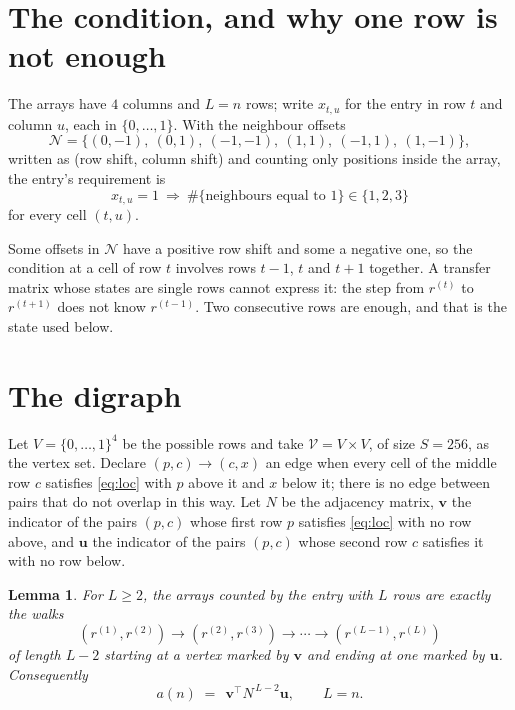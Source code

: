 \documentclass[11pt,a4paper]{article}
\theoremstyle{plain}
\newtheorem{lemma}[theorem]{Lemma}
\theoremstyle{definition}
\begin{document}
\section{The condition, and why one row is not enough}

The arrays have $4$ columns and $L=n$ rows; write $x_{t,u}$ for the entry in
row $t$ and column $u$, each in $\{0,\dots,1\}$. With the neighbour offsets
\[
\mathcal N=\{(0,-1),\ (0,1),\ (-1,-1),\ (1,1),\ (-1,1),\ (1,-1)\},
\]
written as (row shift, column shift) and counting only positions inside the array, the
entry's requirement is
\begin{equation}\label{eq:loc}
x_{t,u}=1\ \Rightarrow\ \#\{\text{neighbours equal to }1\}\in\{1,2,3\}
\end{equation}
for every cell $(t,u)$.

Some offsets in $\mathcal N$ have a positive row shift and some a negative one, so the
condition at a cell of row $t$ involves rows $t-1$, $t$ and $t+1$ together. A transfer
matrix whose states are single rows cannot express it: the step from $r^{(t)}$ to
$r^{(t+1)}$ does not know $r^{(t-1)}$. Two consecutive rows are enough, and that is
the state used below.

\section{The digraph}

Let $V=\{0,\dots,1\}^{4}$ be the possible rows and take
$\mathcal V=V\times V$, of size $S=256$, as the vertex set. Declare $(p,c)\to(c,x)$ an edge
when every cell of the middle row $c$ satisfies \eqref{eq:loc} with $p$ above it and $x$
below it; there is no edge between pairs that do not overlap in this way. Let $N$ be the
adjacency matrix, $\mathbf{v}$ the indicator of the pairs $(p,c)$ whose first row $p$
satisfies \eqref{eq:loc} with no row above, and $\mathbf{u}$ the indicator of
the pairs $(p,c)$ whose second row $c$ satisfies it with no row below.

\begin{lemma}\label{lem:walk}
For $L\ge2$, the arrays counted by the entry with $L$ rows are exactly the walks
\[
(r^{(1)},r^{(2)})\to(r^{(2)},r^{(3)})\to\cdots\to(r^{(L-1)},r^{(L)})
\]
of length $L-2$ starting at a vertex marked by $\mathbf{v}$ and ending at one marked by
$\mathbf{u}$. Consequently
\[
a(n)\;=\;\,\mathbf{v}^{\!\top}N^{\,L-2}\mathbf{u},\qquad L=n .
\]
\end{lemma}
\end{document}
